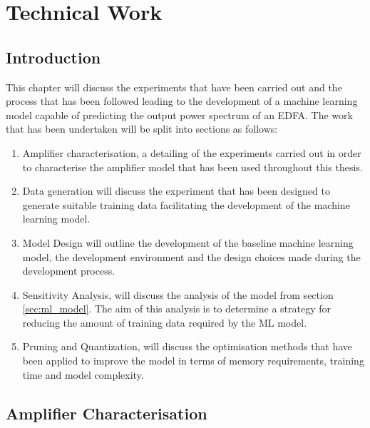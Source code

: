\chapter{Technical Work}
\label{ch:tw}



\section{Introduction} 
\label{tw:intro}

This chapter will discuss the experiments that have been carried out and the process that has been followed leading to the development of a machine learning model capable of predicting the output power spectrum of an EDFA. 
The work that has been undertaken will be split into sections as follows:
\begin{enumerate}
    \item Amplifier characterisation, a detailing of the experiments carried out in order to characterise the amplifier model that has been used throughout this thesis.
    
    \item Data generation will discuss the experiment that has been designed to generate suitable training data facilitating the development of the machine learning model.
    
    \item Model Design will outline the development of the baseline machine learning model, the development environment and the design choices made during the development process.
    
    \item Sensitivity Analysis, will discuss the analysis of the model from section \ref{sec:ml_model}. The aim of this analysis is to determine a strategy for reducing the amount of training data required by the ML model.
    
    \item Pruning and Quantization, will discuss the optimisation methods that have been applied to improve the model in terms of memory requirements, training time and model complexity. 
\end{enumerate}



\newpage
\section{Amplifier Characterisation}
\label{tw:sec:amp_char}


